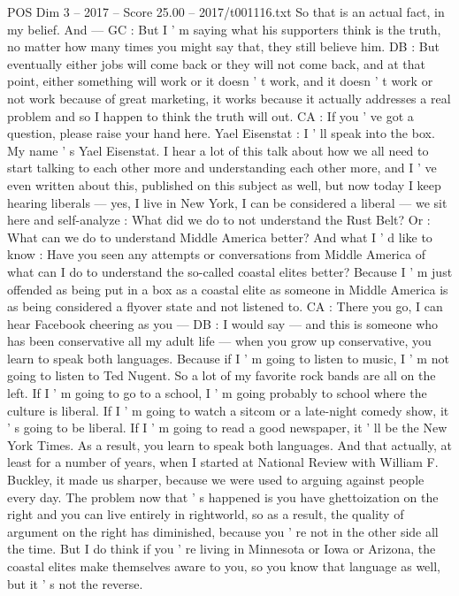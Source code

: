 \begin{textsample}{POS Dim 3 – 2017 – Score 25.00 – 2017/t001116.txt}
So that is an actual fact, in my belief.
And — GC : But I ' m saying what his supporters think is the truth, no matter how many times you might say that, they still believe him.
DB : But eventually either jobs will come back or they will not come back, and at that point, either something will work or it doesn ' t work, and it doesn ' t work or not work because of great marketing, it works because it actually addresses a real problem and so I happen to think the truth will out.
CA : If you ' ve got a question, please raise your hand here.
Yael Eisenstat : I ' ll speak into the box.
My name ' s Yael Eisenstat.
I hear a lot of this talk about how we all need to start talking to each other more and understanding each other more, and I ' ve even written about this, published on this subject as well, but now today I keep hearing liberals — yes, I live in New York, I can be considered a liberal — we sit here and self-analyze : What did we do to not understand the Rust Belt?
Or : What can we do to understand Middle America better?
And what I ' d like to know : Have you seen any attempts or conversations from Middle America of what can I do to understand the so-called coastal elites better?
Because I ' m just offended as being put in a box as a coastal elite as someone in Middle America is as being considered a flyover state and not listened to.
CA : There you go, I can hear Facebook cheering as you — DB : I would say — and this is someone who has been conservative all my adult life — when you grow up conservative, you learn to speak both languages.
Because if I ' m going to listen to music, I ' m not going to listen to Ted Nugent.
So a lot of my favorite rock bands are all on the left.
If I ' m going to go to a school, I ' m going probably to school where the culture is liberal.
If I ' m going to watch a sitcom or a late-night comedy show, it ' s going to be liberal.
If I ' m going to read a good newspaper, it ' ll be the New York Times.
As a result, you learn to speak both languages.
And that actually, at least for a number of years, when I started at National Review with William F.
Buckley, it made us sharper, because we were used to arguing against people every day.
The problem now that ' s happened is you have ghettoization on the right and you can live entirely in rightworld, so as a result, the quality of argument on the right has diminished, because you ' re not in the other side all the time.
But I do think if you ' re living in Minnesota or Iowa or Arizona, the coastal elites make themselves aware to you, so you know that language as well, but it ' s not the reverse.

\end{textsample}
